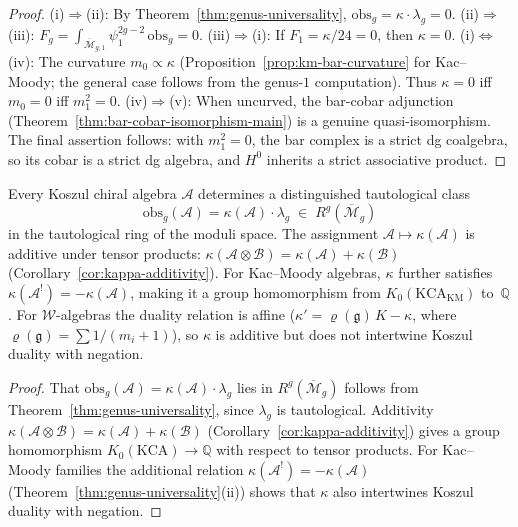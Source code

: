 \begin{proof}
(i)$\Rightarrow$(ii): By Theorem~\ref{thm:genus-universality}, $\mathrm{obs}_g = \kappa \cdot \lambda_g = 0$.
(ii)$\Rightarrow$(iii): $F_g = \int_{\overline{\mathcal{M}}_{g,1}} \psi_1^{2g-2}\, \mathrm{obs}_g = 0$.
(iii)$\Rightarrow$(i): If $F_1 = \kappa/24 = 0$, then $\kappa = 0$.
(i)$\Leftrightarrow$(iv): The curvature $m_0 \propto \kappa$ (Proposition~\ref{prop:km-bar-curvature} for Kac--Moody; the general case follows from the genus-$1$ computation).  Thus $\kappa = 0$ iff $m_0 = 0$ iff $m_1^2 = 0$.
(iv)$\Rightarrow$(v): When uncurved, the bar-cobar adjunction (Theorem~\ref{thm:bar-cobar-isomorphism-main}) is a genuine quasi-isomorphism.
The final assertion follows: with $m_1^2 = 0$, the bar complex is a strict dg coalgebra, so its cobar is a strict dg algebra, and $H^0$ inherits a strict associative product.
\end{proof}

\begin{corollary}\label{cor:tautological-class-map}
Every Koszul chiral algebra $\mathcal{A}$ determines a distinguished tautological class
\[
\mathrm{obs}_g(\mathcal{A}) = \kappa(\mathcal{A}) \cdot \lambda_g \;\in\; R^g(\overline{\mathcal{M}}_g)
\]
in the tautological ring of the moduli space.  The assignment $\mathcal{A} \mapsto \kappa(\mathcal{A})$ is additive under tensor products: $\kappa(\mathcal{A} \otimes \mathcal{B}) = \kappa(\mathcal{A}) + \kappa(\mathcal{B})$ \textup{(}Corollary~\ref{cor:kappa-additivity}\textup{)}.  For Kac--Moody algebras, $\kappa$ further satisfies $\kappa(\mathcal{A}^!) = -\kappa(\mathcal{A})$, making it a group homomorphism from $K_0(\mathrm{KCA}_{\mathrm{KM}})$ to~$\mathbb{Q}$.  For $\mathcal{W}$-algebras the duality relation is affine \textup{(}$\kappa' = \varrho(\mathfrak{g})\,K - \kappa$, where $\varrho(\mathfrak{g}) = \sum 1/(m_i+1)$\textup{)}, so $\kappa$ is additive but does not intertwine Koszul duality with negation.
\end{corollary}

\begin{proof}
That $\mathrm{obs}_g(\mathcal{A}) = \kappa(\mathcal{A}) \cdot \lambda_g$ lies in $R^g(\overline{\mathcal{M}}_g)$ follows from Theorem~\ref{thm:genus-universality}, since $\lambda_g$ is tautological.  Additivity $\kappa(\mathcal{A} \otimes \mathcal{B}) = \kappa(\mathcal{A}) + \kappa(\mathcal{B})$ (Corollary~\ref{cor:kappa-additivity}) gives a group homomorphism $K_0(\mathrm{KCA}) \to \mathbb{Q}$ with respect to tensor products.  For Kac--Moody families the additional relation $\kappa(\mathcal{A}^!) = -\kappa(\mathcal{A})$ (Theorem~\ref{thm:genus-universality}(ii)) shows that $\kappa$ also intertwines Koszul duality with negation.
\end{proof}

